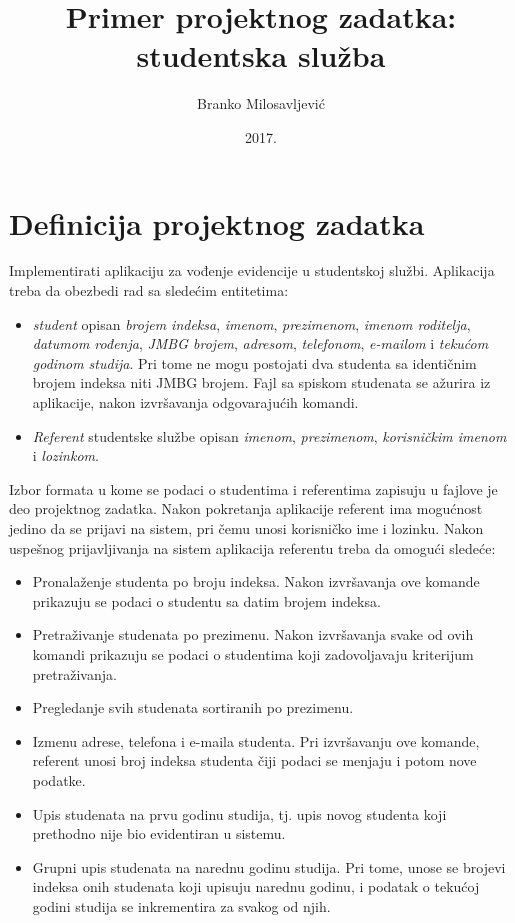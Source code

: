\documentclass[a4paper]{article}
\title{Primer projektnog zadatka: studentska služba}
\date{2017.}
\author{Branko Milosavljević}
\begin{document}
\maketitle

\section{Definicija projektnog zadatka}

Implementirati aplikaciju za vođenje evidencije u studentskoj službi. Aplikacija
treba da obezbedi rad sa sledećim entitetima:

\begin{itemize}
  \item \textit{student} opisan \textit{brojem indeksa}, \textit{imenom},
  \textit{prezimenom}, \textit{imenom roditelja},
  \textit{datumom rođenja}, \textit{JMBG brojem}, \textit{adresom},
  \textit{telefonom}, \textit{e-mailom} i \textit{tekućom godinom studija}. Pri
  tome ne mogu postojati dva studenta sa identičnim brojem indeksa niti JMBG
  brojem. Fajl sa spiskom studenata se ažurira iz aplikacije, nakon izvršavanja
  odgovarajućih komandi.

  \item \textit{Referent} studentske službe opisan \textit{imenom},
  \textit{prezimenom}, \textit{korisničkim imenom} i \textit{lozinkom}.
\end{itemize}

Izbor formata u kome se podaci o studentima i referentima zapisuju u fajlove je
deo projektnog zadatka. Nakon pokretanja aplikacije referent ima mogućnost
jedino da se prijavi na sistem, pri čemu unosi korisničko ime i lozinku. Nakon
uspešnog prijavljivanja na sistem aplikacija referentu treba da omogući sledeće:

\begin{itemize}
  \item Pronalaženje studenta po broju indeksa. Nakon izvršavanja ove komande
  prikazuju se podaci o studentu sa datim brojem indeksa.

  \item Pretraživanje studenata po prezimenu. Nakon izvršavanja svake od ovih
  komandi prikazuju se podaci o studentima koji zadovoljavaju kriterijum
  pretraživanja.

  \item Pregledanje svih studenata sortiranih po prezimenu.

  \item Izmenu adrese, telefona i e-maila studenta. Pri izvršavanju ove komande,
  referent unosi broj indeksa studenta čiji podaci se menjaju i potom nove 
  podatke.
  
  \item Upis studenata na prvu godinu studija, tj. upis novog studenta koji 
  prethodno nije bio evidentiran u sistemu.
  
  \item Grupni upis studenata na narednu godinu studija. Pri tome, unose se
  brojevi indeksa onih studenata koji upisuju narednu godinu, i podatak o
tekućoj
  godini studija se inkrementira za svakog od njih.
  
\end{itemize}
\end{document}
